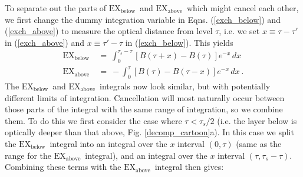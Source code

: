 \documentclass{ametsoc}
\newcommand{\n}{\nonumber}
\newcommand{\eqnref}[1]{(\ref{#1})}
\newcommand{\taus}{\ensuremath{\tau_s}}
\newcommand{\EXbelow}{\ensuremath{\mathrm{EX_{below}}}}
\newcommand{\EXabove}{\ensuremath{\mathrm{EX_{above}}}}
\begin{document}
To separate out the parts of \EXbelow\ and \EXabove\ which might cancel each other, we first change the dummy integration variable in  Eqns.  \eqnref{exch_below} and \eqnref{exch_above} to measure the optical distance from level $\tau$, i.e. we set
$x \equiv \tau-\tau'$ in \eqnref{exch_above} and $x \equiv \tau'-\tau$ in \eqnref{exch_below}. This yields
\begin{align}	
	\EXbelow &\  = \ \int_{0}^{\taus - \tau} [B(\tau+x)-B(\tau)]e^{-x} \, dx \n \\	
	\EXabove &\ = \ -\int_{0}^{ \tau} [B(\tau)-B(\tau-x)]e^{-x} \, dx 	\ . \n
\end{align}	
The \EXbelow\ and \EXabove\ integrals now look similar, but with potentially different limits of integration. Cancellation will most naturally occur between those parts of the integral with the same range of integration, so we combine them. To do this we first consider the case where $\tau < \taus/2$ (i.e.  the layer below is optically deeper than that above, Fig. \ref{decomp_cartoon}a). In this case we split the \EXbelow\ integral into an integral over the $x$ interval $(0,\tau)$ (same as the range for the \EXabove\ integral), and an integral over the $x$ interval $(\tau,\taus-\tau)$. Combining these terms with  the \EXabove\ integral  then gives:
\end{document}
